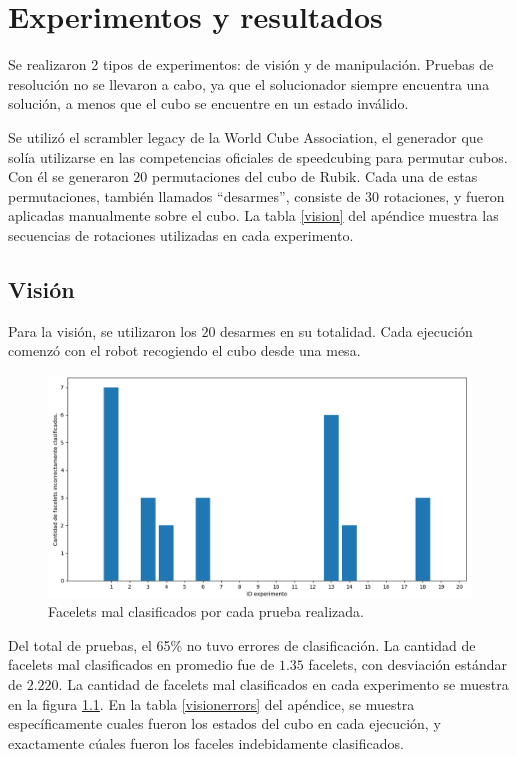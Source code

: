 \chapter{Experimentos y resultados}

Se realizaron 2 tipos de experimentos: de visión y de manipulación. Pruebas de resolución no se llevaron a cabo, ya que el solucionador siempre encuentra una solución, a menos que el cubo se encuentre en un estado inválido.

Se utilizó el scrambler legacy de la World Cube Association, el generador que solía utilizarse en las competencias oficiales de speedcubing para permutar  cubos. Con él se generaron $20$ permutaciones del cubo de Rubik. Cada una de estas permutaciones, también llamados ``desarmes'', consiste de $30$ rotaciones, y fueron aplicadas manualmente sobre el cubo. La tabla \ref{vision} del apéndice muestra las secuencias de rotaciones utilizadas en cada experimento.

\section{Visión}
Para la visión, se utilizaron los $20$ desarmes en su totalidad. Cada ejecución comenzó con el robot recogiendo el cubo desde una mesa.

\begin{figure}[h!]
	\centering
	\includegraphics[width=\textwidth]{figures/error_facelet}
	\caption{Facelets mal clasificados por cada prueba realizada.}
	\label{erroresfacelets}
\end{figure}
Del total de pruebas, el 65\% no tuvo errores de clasificación. La cantidad de facelets mal clasificados en promedio fue de $1.35$ facelets, con desviación estándar de $2.220$. La cantidad de facelets mal clasificados en cada experimento se muestra en la figura \ref{erroresfacelets}. En la tabla \ref{visionerrors} del apéndice, se muestra específicamente cuales fueron los estados del cubo en cada ejecución, y exactamente cúales fueron los faceles indebidamente clasificados.

